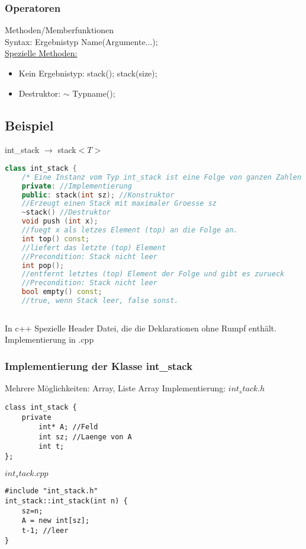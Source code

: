 \documentclass[a4paper]{article}
\begin{document}
\subsubsection*{Operatoren}
Methoden/Memberfunktionen\\
Syntax: Ergebnistyp Name(Argumente...);\\
\underline{Spezielle Methoden:} 
\begin{itemize}
	\item Kein Ergebnistyp: stack(); stack(size);
	\item Destruktor: $\sim$ Typname();
\end{itemize}
\subsection{Beispiel}
int\_stack $\rightarrow$ stack$<T>$\\
\begin{lstlisting}[language=c++]
class int_stack {
	/* Eine Instanz vom Typ int_stack ist eine Folge von ganzen Zahlen (int). Eine Folge der laenge 0 heisst der leere Stack.*/
	private: //Implementierung
	public: stack(int sz); //Konstruktor
	//Erzeugt einen Stack mit maximaler Groesse sz
	~stack() //Destruktor
	void push (int x);
	//fuegt x als letzes Element (top) an die Folge an.
	int top() const;
	//liefert das letzte (top) Element
	//Precondition: Stack nicht leer
	int pop();
	//entfernt letztes (top) Element der Folge und gibt es zurueck
	//Precondition: Stack nicht leer
	bool empty() const;
	//true, wenn Stack leer, false sonst.
	
\end{lstlisting}
In c++ Spezielle Header Datei, die die Deklarationen ohne Rumpf enthält. Implementierung in .cpp\\
\subsubsection*{Implementierung der Klasse int\_stack}
Mehrere Möglichkeiten: Array, Liste
Array Implementierung:
$int_stack.h$
\begin{lstlisting}
class int_stack {
	private 
		int* A; //Feld
		int sz; //Laenge von A
		int t;
};
\end{lstlisting}
$int_stack.cpp$
\begin{lstlisting}
#include "int_stack.h"
int_stack::int_stack(int n) {
	sz=n;
	A = new int[sz];
	t-1; //leer
}
\end{lstlisting}
\end{document}
